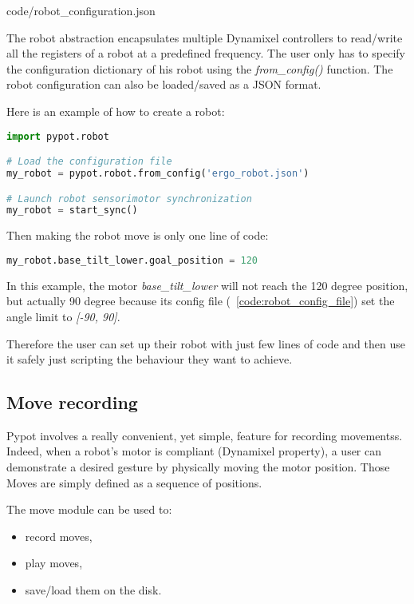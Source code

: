 
    {code/robot_configuration.json}


The robot abstraction encapsulates multiple Dynamixel controllers to read/write all the registers of a robot at a predefined frequency. The user only has to specify the configuration dictionary of his robot using the \emph{from\_config()} function. The robot configuration can also be loaded/saved as a JSON format.

Here is an example of how to create a robot:
\begin{lstlisting}[language = Python]
import pypot.robot

# Load the configuration file
my_robot = pypot.robot.from_config('ergo_robot.json')

# Launch robot sensorimotor synchronization
my_robot = start_sync()
\end{lstlisting}


Then making the robot move is only one line of code:
\begin{lstlisting}[language = Python]
my_robot.base_tilt_lower.goal_position = 120
\end{lstlisting}

In this example, the motor \emph{base\_tilt\_lower} will not reach the 120 degree position, but actually 90 degree because its config file (\codename~\ref{code:robot_config_file}) set the angle limit to \emph{[-90, 90]}.

Therefore the user can set up their robot with just few lines of code and then use it safely just scripting the behaviour they want to achieve.


\subsection{Move recording} %
\label{sub:move_recording}

Pypot involves a really convenient, yet simple, feature for recording movementss. Indeed, when a robot's motor is compliant (Dynamixel property), a user can demonstrate a desired gesture by physically moving the motor position. Those Moves are simply defined as a sequence of positions.

The move module can be used to:

\begin{itemize}
    \item record moves,
    \item play moves,
    \item save/load them on the disk.
\end{itemize}

